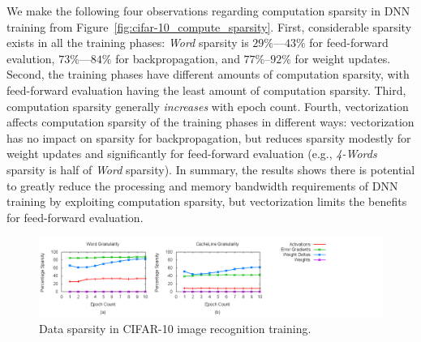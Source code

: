 We make the following four observations regarding computation sparsity in DNN training from Figure~\ref{fig:cifar-10_compute_sparsity}.  First, considerable sparsity exists in all the training phases: {\it Word} sparsity is $29\%$---$43\%$ for feed-forward evalution, $73\%$---$84\%$ for backpropagation, and $77\%$--$92\%$ for weight updates.   Second, the training phases have different amounts of computation sparsity, with feed-forward evaluation having the least amount of computation sparsity. Third, computation sparsity generally \emph{increases} with epoch count.  Fourth, vectorization affects computation sparsity of the training phases in different ways: vectorization has no impact on sparsity for backpropagation, but reduces sparsity modestly for weight updates and significantly for feed-forward evaluation (e.g., {\it 4-Words} sparsity is half of {\it Word} sparsity).  In summary, the results shows there is potential to greatly reduce the processing and memory bandwidth requirements of DNN training by exploiting computation sparsity, but vectorization limits the benefits for feed-forward evaluation. 

  
 \begin{figure}
 \centering
 \includegraphics[width=1.9\columnwidth]{Figures/multi_datasparsity.png}
\caption{Data sparsity in CIFAR-10 image recognition training.}
 \label{fig:cifar-10_data_sparsity}
 \end{figure}

